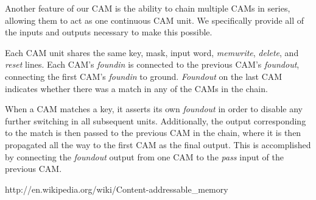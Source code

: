 \documentclass{article}
\begin{document}
  Another feature of our CAM is the ability to chain multiple CAMs in series,
  allowing them to act as one continuous CAM unit.  We specifically provide all
  of the inputs and outputs necessary to make this possible.

  Each CAM unit shares the same key, mask, input word, {\it memwrite}, {\it delete}, and
  {\it reset} lines.  Each CAM's {\it foundin} is connected to the previous CAM's {\it foundout},
  connecting the first CAM's {\it foundin} to ground.  {\it Foundout} on the last CAM
  indicates whether there was a match in any of the CAMs in the chain.

  When a CAM matches a key, it asserts its own {\it foundout} in order to disable any
  further switching in all subsequent units.  Additionally, the output
  corresponding to the match is then passed to the previous CAM in the chain,
  where it is then propagated all the way to the first CAM as the final output.
  This is accomplished by connecting the {\it foundout} output from one CAM to the
  {\it pass} input of the previous CAM.

  \begin{thebibliography}{1}
   http://en.wikipedia.org/wiki/Content-addressable\_memory
  \end{thebibliography}
\end{document}

